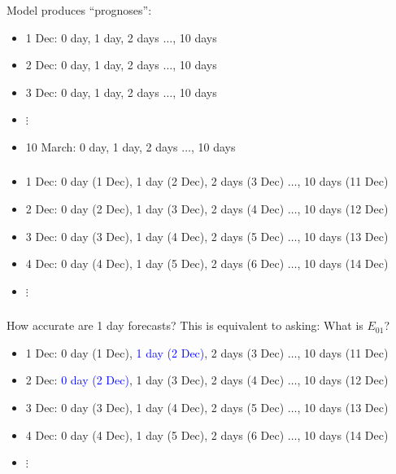 \documentclass[aspectratio=169]{beamer}
\begin{document}
\begin{frame}
\frametitle{}

Model produces ``prognoses'':
\begin{itemize}
\item 1 Dec: 0 day, 1 day, 2 days $\ldots$, 10 days
\item 2 Dec: 0 day, 1 day, 2 days $\ldots$, 10 days
\item 3 Dec: 0 day, 1 day, 2 days $\ldots$, 10 days
\item $\vdots$
\item 10 March: 0 day, 1 day, 2 days $\ldots$, 10 days
\end{itemize}
\end{frame}
\begin{frame}
\frametitle{}

\begin{itemize}
\item 1 Dec: 0 day (1 Dec), 1 day (2 Dec), 2 days (3 Dec) $\ldots$, 10 days (11 Dec)
\pause
\item 2 Dec: 0 day (2 Dec), 1 day (3 Dec), 2 days (4 Dec) $\ldots$, 10 days (12 Dec)
\pause
\item 3 Dec: 0 day (3 Dec), 1 day (4 Dec), 2 days (5 Dec) $\ldots$, 10 days (13 Dec)
\pause
\item 4 Dec: 0 day (4 Dec), 1 day (5 Dec), 2 days (6 Dec) $\ldots$, 10 days (14 Dec)
\item $\vdots$
\end{itemize}

\end{frame}
\begin{frame}
\frametitle{}

How accurate are 1 day forecasts? This is equivalent to asking:  What is $E_{01}$?
\begin{itemize}
\item 1 Dec: 0 day (1 Dec), \textcolor{blue}{1 day (2 Dec)}, 2 days (3 Dec) $\ldots$, 10 days (11 Dec)
\item 2 Dec: \textcolor{blue}{0 day (2 Dec)}, 1 day (3 Dec), 2 days (4 Dec) $\ldots$, 10 days (12 Dec)
\item 3 Dec: 0 day (3 Dec), 1 day (4 Dec), 2 days (5 Dec) $\ldots$, 10 days (13 Dec)
\item 4 Dec: 0 day (4 Dec), 1 day (5 Dec), 2 days (6 Dec) $\ldots$, 10 days (14 Dec)
\item $\vdots$
\end{itemize}

\end{frame}
\end{document}
